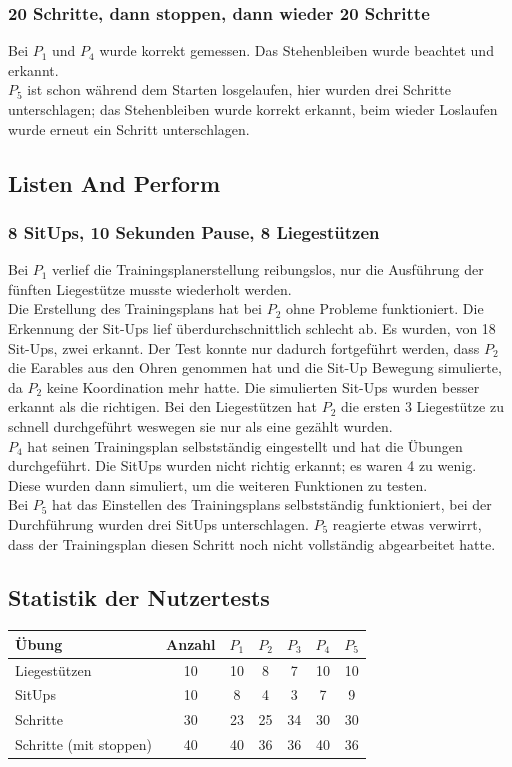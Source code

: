 \documentclass[a4paper,12pt]{article}
\begin{document}
\subsubsection{20 Schritte, dann stoppen, dann wieder 20 Schritte}
Bei  $P_1$ und $P_4$ wurde korrekt gemessen. Das Stehenbleiben wurde beachtet und erkannt.\\
$P_5$ ist schon während dem Starten losgelaufen, hier wurden drei Schritte unterschlagen; das Stehenbleiben wurde korrekt erkannt, beim wieder Loslaufen wurde erneut ein Schritt unterschlagen.\\
\subsection{Listen And Perform}
\subsubsection{8 SitUps, 10 Sekunden Pause, 8 Liegestützen}
Bei $P_1$ verlief die Trainingsplanerstellung reibungslos, nur die Ausführung der fünften Liegestütze musste wiederholt werden.\\
Die Erstellung des Trainingsplans hat bei $P_2$ ohne Probleme funktioniert. Die Erkennung der Sit-Ups lief überdurchschnittlich schlecht ab. Es wurden, von 18 Sit-Ups, zwei erkannt. Der Test konnte nur dadurch fortgeführt werden, dass $P_2$ die Earables aus den Ohren genommen hat und die Sit-Up Bewegung simulierte, da $P_2$ keine Koordination mehr hatte. Die simulierten Sit-Ups wurden besser erkannt als die richtigen. Bei den Liegestützen hat $P_2$ die ersten 3 Liegestütze zu schnell durchgeführt weswegen sie nur als eine gezählt wurden.\\
$P_4$ hat seinen Trainingsplan selbstständig eingestellt und hat die Übungen durchgeführt. Die SitUps wurden nicht richtig erkannt; es waren 4 zu wenig. Diese wurden dann simuliert, um die weiteren Funktionen zu testen.\\
Bei $P_5$ hat das Einstellen des Trainingsplans selbstständig funktioniert, bei der Durchführung wurden drei SitUps unterschlagen. $P_5$ reagierte etwas verwirrt, dass der Trainingsplan diesen Schritt noch nicht vollständig abgearbeitet hatte.
\subsection{Statistik der Nutzertests}
\begin{tabular}{ | l | c | c | c | c | c | c |}
	\hline
	\textbf{Übung} & \textbf{Anzahl} & $P_1$ & $P_2$ & $P_3$ & $P_4$ & $P_5$\\
	\hline
	Liegestützen & 10 & 10 & 8 & 7 & 10 & 10 \\
	\hline
	SitUps & 10 & 8 & 4 & 3 & 7 & 9 \\
	\hline
	Schritte & 30 & 23 &25 & 34 & 30 & 30 \\
	\hline
	Schritte (mit stoppen) & 40 & 40 & 36 & 36 & 40 & 36 \\
	\hline
\end{tabular}\\
\end{document}
